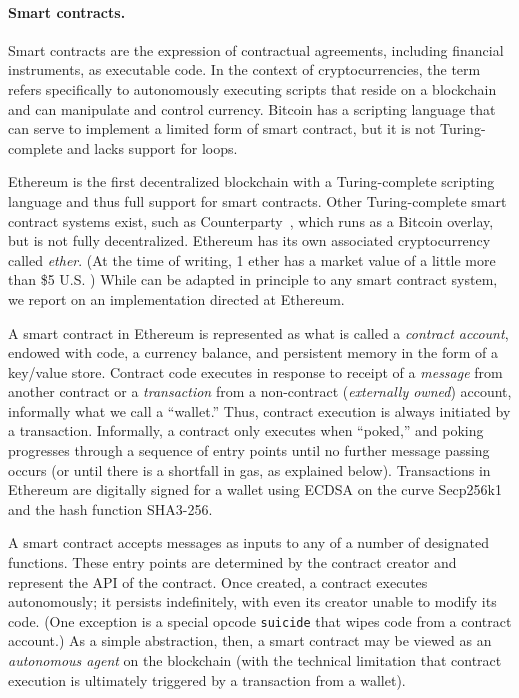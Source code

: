 \paragraph{\bf Smart contracts.}
\label{sec:contracts-and-gas}

Smart contracts are the expression of contractual agreements, including financial instruments, as executable code. In the context of cryptocurrencies, the term refers specifically to autonomously executing scripts that reside on a blockchain and can manipulate and control currency. Bitcoin has a scripting language that can serve to implement a limited form of smart contract, but it is not Turing-complete and lacks support for loops. 

Ethereum is the first decentralized blockchain with a Turing-complete scripting language and thus full support for smart contracts. Other Turing-complete smart contract systems exist, such as Counterparty~\cite{}, which runs as a Bitcoin overlay, but is not fully decentralized. Ethereum has its own associated cryptocurrency called \emph{ether}. (At the time of writing, 1 ether has a market value of a little more than \$5 U.S. ) While \tc can be adapted in principle to any smart contract system, we report on an implementation directed at Ethereum.

A smart contract in Ethereum is represented as what is called a \emph{contract account}, endowed with code, a currency balance, and persistent memory in the form of a key/value store. Contract code executes in response to receipt of a \emph{message} from another contract or a \emph{transaction} from a non-contract (\emph{externally owned}) account, informally what we call a ``wallet.'' Thus, contract execution is always initiated by a transaction. Informally, a contract only executes when ``poked,'' and poking progresses through a sequence of entry points until no further message passing occurs (or until there is a shortfall in gas, as explained below). Transactions in Ethereum are digitally signed for a wallet using ECDSA on the curve Secp256k1 and the hash function SHA3-256. 

A smart contract accepts messages as inputs to any of a number of designated functions. These entry points are determined by the contract creator and represent the API of the contract. Once created, a contract executes autonomously; it persists indefinitely, with even its creator unable to modify its code. (One exception is a special opcode \texttt{suicide} that wipes code from a contract account.) As a simple abstraction, then, a smart contract may be viewed as an {\em autonomous agent} on the blockchain (with the technical limitation that contract execution is ultimately triggered by a transaction from a wallet). 

